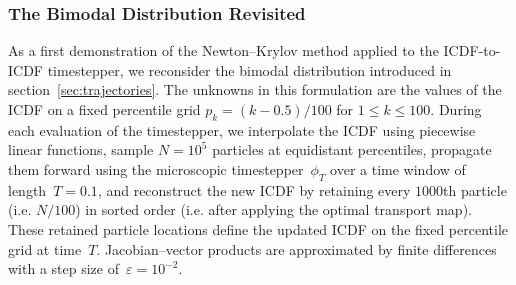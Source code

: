 \documentclass{article}
\begin{document}
\subsubsection{The Bimodal Distribution Revisited}
As a first demonstration of the Newton–Krylov method applied to the ICDF-to-ICDF timestepper, we reconsider the bimodal distribution introduced in section~\ref{sec:trajectories}. The unknowns in this formulation are the values of the ICDF on a fixed percentile grid $p_k = (k - 0.5)/100$ for $1 \leq k \leq 100$. During each evaluation of the timestepper, we interpolate the ICDF using piecewise linear functions, sample $N = 10^5$ particles at equidistant percentiles, propagate them forward using the microscopic timestepper~$\phi_T$ over a time window of length~$T = 0.1$, and reconstruct the new ICDF by retaining every $1000$th particle (i.e. $N / 100$) in sorted order (i.e. after applying the optimal transport map). These retained particle locations define the updated ICDF on the fixed percentile grid at time~$T$. Jacobian–vector products are approximated by finite differences with a step size of~$\varepsilon = 10^{-2}$.
\end{document}
